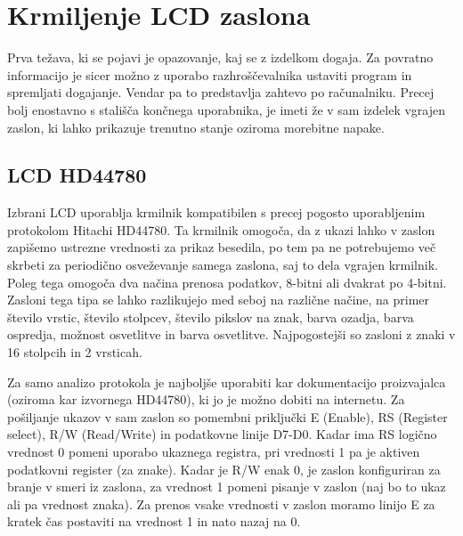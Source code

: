 \documentclass[12pt,a4paper,twoside,openright,slovene]{book}
\begin{document}
\section{Krmiljenje LCD zaslona}
Prva težava, ki se pojavi je opazovanje, kaj se z izdelkom dogaja. Za povratno informacijo je sicer možno z uporabo razhroščevalnika ustaviti program in spremljati dogajanje. Vendar pa to predstavlja zahtevo po računalniku. Precej bolj enostavno s stališča končnega uporabnika, je imeti že v sam izdelek vgrajen zaslon, ki lahko prikazuje trenutno stanje oziroma morebitne napake.

\subsection{LCD HD44780}
Izbrani LCD uporablja krmilnik kompatibilen s precej pogosto uporabljenim protokolom Hitachi HD44780. Ta krmilnik omogoča, da z ukazi lahko v zaslon zapišemo ustrezne vrednosti za prikaz besedila, po tem pa ne potrebujemo več skrbeti za periodično osveževanje samega zaslona, saj to dela vgrajen krmilnik. Poleg tega omogoča dva načina prenosa podatkov, 8-bitni ali dvakrat po 4-bitni. Zasloni tega tipa se lahko razlikujejo med seboj na različne načine, na primer število vrstic, število stolpcev, število pikslov na znak, barva ozadja, barva ospredja, možnost osvetlitve in barva osvetlitve. Najpogostejši so zasloni z znaki v 16 stolpcih in 2 vrsticah. 

Za samo analizo protokola je najboljše uporabiti kar dokumentacijo proizvajalca (oziroma kar izvornega HD44780), ki jo je možno dobiti na internetu. Za pošiljanje ukazov v sam zaslon so pomembni priključki E (Enable), RS (Register select), R/W (Read/Write) in podatkovne linije D7-D0. Kadar ima RS logično vrednost 0 pomeni uporabo ukaznega registra, pri vrednosti 1 pa je aktiven podatkovni register (za znake). Kadar je R/W enak 0, je zaslon konfiguriran za branje v smeri iz zaslona, za vrednost 1 pomeni pisanje v zaslon (naj bo to ukaz ali pa vrednost znaka). Za prenos vsake vrednosti v zaslon moramo linijo E za kratek čas postaviti na vrednost 1 in nato nazaj na 0.
\end{document}
